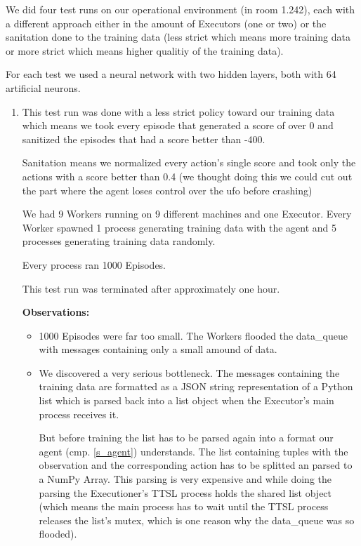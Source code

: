 We did four test runs on our operational environment (in
room 1.242), each with a different approach either in the
amount of Executors (one or two) or the sanitation done
to the training data (less strict which means more training
data or more strict which means higher qualitiy of the
training data).

For each test we used a neural network with two hidden
layers, both with 64 artificial neurons.

\begin{enumerate}

  \item This test run was done with a less strict policy
        toward our training data which means we took every
        episode that generated a score of over 0 and
        sanitized the episodes that had a score better than
        -400.

        Sanitation means we normalized every action's
        single score and took only the actions with a score
        better than 0.4 (we thought doing this we could
        cut out the part where the agent loses control over
        the ufo before crashing)

        We had 9 Workers running on 9 different machines
        and one Executor. Every Worker spawned 1 process
        generating training data with the agent and 5
        processes generating training data randomly.

        Every process ran 1000 Episodes.

        This test run was terminated after approximately
        one hour.

        \textbf{Observations:}

        \begin{itemize}

          \item 1000 Episodes were far too small. The
                Workers flooded the data\_queue with
                messages containing only a small amound of
                data.

          \item We discovered a very serious bottleneck.
                The messages containing the training data
                are formatted as a JSON string
                representation of a Python list which is
                parsed back into a list object when the
                Executor's main process receives it.

                But before training the list has to be
                parsed again into a format our agent (cmp.
                \ref{s_agent}) understands. The list
                containing tuples with the observation and
                the corresponding action has to be splitted
                an parsed to a NumPy Array. This parsing is
                very expensive and while doing the parsing
                the Executioner's TTSL process holds the
                shared list object (which means the main
                process has to wait until the TTSL process
                releases the list's mutex, which is one
                reason why the data\_queue was so flooded).


\end{itemize}
\end{enumerate}
